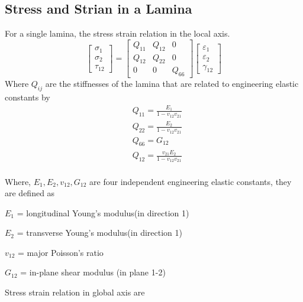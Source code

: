 \documentclass[smallextended]{svjour3}       %
\begin{document}
\subsection{Stress and Strian in a Lamina}
For a single lamina, the stress strain relation in the local axis.
\begin{equation}
    \begin{bmatrix}
        \sigma_1\\
        \sigma_2\\
        \tau_{12}
    \end{bmatrix}
    =
    \begin{bmatrix}
        Q_{11} & Q_{12} & 0\\
        Q_{12} & Q_{22} & 0\\
        0      &  0     & Q_{66}
    \end{bmatrix}
    \begin{bmatrix}
        \varepsilon_1\\
        \varepsilon_2\\
		\gamma_{12}
    \end{bmatrix}
\end{equation}
Where $Q_{ij}$ are the stiffnesses of the lamina that are related to 
engineering elastic constants by
\begin{equation}
    \begin{split}
    &Q_{11}=\frac{E_1}{1-v_{12}v_{21}}\\
    &Q_{22}=\frac{E_2}{1-v_{12}v_{21}}\\
    &Q_{66}=G_{12}\\
    &Q_{12}=\frac{v_{21}E_2}{1-v_{12}v_{21}}\\
    \end{split}
\end{equation}

Where, $E_1, E_2, v_{12}, G_{12}$ are four independent engineering elastic constants, they are
defined as 
\vspace{3mm}

$E_1$ = longitudinal Young's modulus(in direction 1)

$E_2$ = transverse  Young's modulus(in direction 1)

$v_{12}$ = major Poisson's ratio

$G_{12}$ = in-plane shear modulus (in plane 1-2)
\vspace{3mm}

Stress strain relation in global axis are
\end{document}
